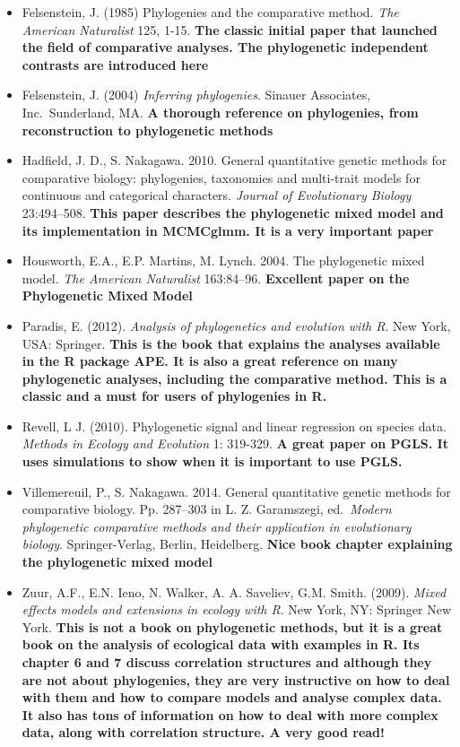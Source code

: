 \documentclass[
]{book}
\providecommand{\tightlist}{%
  \setlength{\itemsep}{0pt}\setlength{\parskip}{0pt}}
\begin{document}
\begin{itemize}
\tightlist
\item
  Felsenstein, J. (1985) Phylogenies and the comparative method. \emph{The American Naturalist} 125, 1-15. \textbf{The classic initial paper that launched the field of comparative analyses. The phylogenetic independent contrasts are introduced here}
\item
  Felsenstein, J. (2004) \emph{Inferring phylogenies}. Sinauer Associates, Inc.~Sunderland, MA. \textbf{A thorough reference on phylogenies, from reconstruction to phylogenetic methods}
\item
  Hadfield, J. D., S. Nakagawa. 2010. General quantitative genetic methods for comparative biology: phylogenies, taxonomies and multi-trait models for continuous and categorical characters. \emph{Journal of Evolutionary Biology} 23:494--508. \textbf{This paper describes the phylogenetic mixed model and its implementation in MCMCglmm. It is a very important paper}
\item
  Housworth, E.A., E.P. Martins, M. Lynch. 2004. The phylogenetic mixed model. \emph{The American Naturalist} 163:84--96. \textbf{Excellent paper on the Phylogenetic Mixed Model}
\item
  Paradis, E. (2012). \emph{Analysis of phylogenetics and evolution with R}. New York, USA: Springer. \textbf{This is the book that explains the analyses available in the R package APE. It is also a great reference on many phylogenetic analyses, including the comparative method. This is a classic and a must for users of phylogenies in R.}
\item
  Revell, L J. (2010). Phylogenetic signal and linear regression on species data. \emph{Methods in Ecology and Evolution} 1: 319-329. \textbf{A great paper on PGLS. It uses simulations to show when it is important to use PGLS.}
\item
  Villemereuil, P., S. Nakagawa. 2014. General quantitative genetic methods for comparative biology. Pp. 287--303 in L. Z. Garamszegi, ed.~\emph{Modern phylogenetic comparative methods and their application in evolutionary biology}. Springer-Verlag, Berlin, Heidelberg. \textbf{Nice book chapter explaining the phylogenetic mixed model}
\item
  Zuur, A.F., E.N. Ieno, N. Walker, A. A. Saveliev, G.M. Smith. (2009). \emph{Mixed effects models and extensions in ecology with R}. New York, NY: Springer New York. \textbf{This is not a book on phylogenetic methods, but it is a great book on the analysis of ecological data with examples in R. Its chapter 6 and 7 discuss correlation structures and although they are not about phylogenies, they are very instructive on how to deal with them and how to compare models and analyse complex data. It also has tons of information on how to deal with more complex data, along with correlation structure. A very good read!}
\end{itemize}
\end{document}
